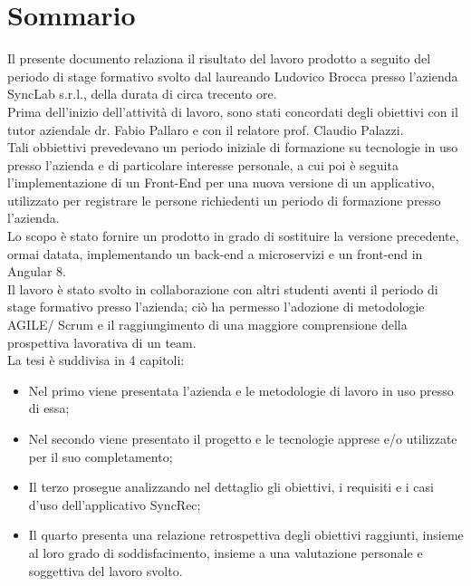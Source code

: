 
\cleardoublepage
{}
{}
\begingroup
\let\clearpage\relax
\let\cleardoublepage\relax
\let\cleardoublepage\relax

\chapter*{Sommario}

Il presente documento relaziona il risultato del lavoro prodotto a seguito del periodo di stage formativo svolto dal laureando Ludovico Brocca presso l'azienda SyncLab s.r.l., della durata di circa trecento ore.\\
Prima dell'inizio dell'attività di lavoro, sono stati concordati degli obiettivi con il tutor aziendale dr. Fabio Pallaro e con il relatore prof. Claudio Palazzi.\\
Tali obbiettivi prevedevano un periodo iniziale di formazione su tecnologie in uso presso l'azienda e di particolare interesse personale, a cui poi è seguita l'implementazione di un Front-End per una nuova versione di un applicativo, utilizzato per registrare le persone richiedenti un periodo di formazione presso l'azienda.\\
Lo scopo è stato fornire un prodotto in grado di sostituire la versione precedente, ormai datata, implementando un back-end a microservizi e un front-end in Angular 8.\\
Il lavoro è stato svolto in collaborazione con altri studenti aventi il periodo di stage formativo presso l'azienda; ciò ha permesso l'adozione di metodologie AGILE/ Scrum e il raggiungimento di una maggiore comprensione della prospettiva lavorativa di un team.\\
La tesi è suddivisa in 4 capitoli:
\begin{itemize}
	\item Nel primo viene presentata l'azienda e le metodologie di lavoro in uso presso di essa;
	\item Nel secondo viene presentato il progetto e le tecnologie apprese e/o utilizzate per il suo completamento;
	\item Il terzo prosegue analizzando nel dettaglio gli obiettivi, i requisiti e i casi d'uso dell'applicativo SyncRec; 
	\item Il quarto presenta una relazione retrospettiva degli obiettivi raggiunti, insieme al loro grado di soddisfacimento, insieme a una valutazione personale e soggettiva del lavoro svolto.
\end{itemize}
